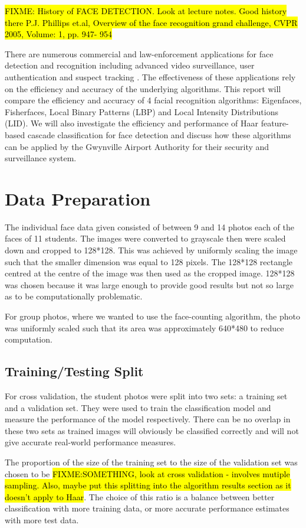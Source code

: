 \documentclass{article}
\begin{document}
\hl{FIXME: History of FACE DETECTION. Look at lecture notes. Good history there P.J. Phillips et.al, Overview of the face recognition grand challenge, CVPR 2005, Volume: 1, pp. 947- 954 }

There are numerous commercial and law-enforcement applications for face detection and recognition including advanced video surveillance, user authentication and suspect tracking \cite{zhao2003face}. The effectiveness of these applications rely on the efficiency and accuracy of the underlying algorithms. This report will compare the efficiency and accuracy of 4 facial recognition algorithms: Eigenfaces, Fisherfaces, Local Binary Patterns (LBP) and Local Intensity Distributions (LID). We will also investigate the efficiency and performance of Haar feature-based cascade classification for face detection and discuss how these algorithms can be applied by the Gwynville Airport Authority for their security and surveillance system.


\section{Data Preparation}
The individual face data given consisted of between 9 and 14 photos each of the faces of 11 students. The images were converted to grayscale then were scaled down and cropped to 128*128. This was achieved by uniformly scaling the image such that the smaller dimension was equal to 128 pixels. The 128*128 rectangle centred at the centre of the image was then used as the cropped image. 128*128 was chosen because it was large enough to provide good results but not so large as to be computationally problematic.

For group photos, where we wanted to use the face-counting algorithm, the photo was uniformly scaled such that its area was approximately 640*480 to reduce computation.

\subsection{Training/Testing Split}
For cross validation, the student photos were split into two sets: a training set and a validation set. They were used to train the classification model and measure the performance of the model respectively. There can be no overlap in these two sets as trained images will obviously be classified correctly and will not give accurate real-world performance measures.

The proportion of the size of the training set to the size of the validation set was chosen to be \hl{FIXME:SOMETHING, look at cross validation - involves mutiple sampling. Also, maybe put this splitting into the algorithm results section as it doesn't apply to Haar}. The choice of this ratio is a balance between better classification with more training data, or more accurate performance estimates with more test data.
\end{document}
